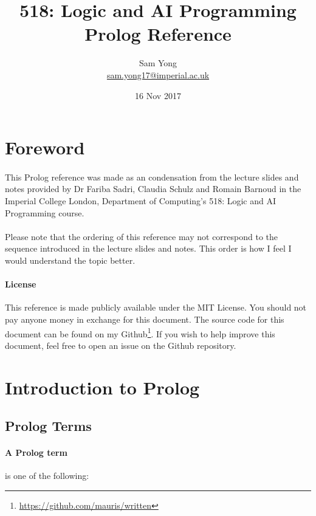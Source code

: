 \documentclass{article}
\title{
	 \large 518: Logic and AI Programming \\
	 \huge Prolog Reference
}
\date{16 Nov 2017}
\author{
	Sam Yong \\
	\small \href{mailto:sam.yong17@imperial.ac.uk}{sam.yong17@imperial.ac.uk}
}
\begin{document}
  \maketitle
  
  \begin{multicols}{2}
  
  \section*{Foreword}  
  
  \paragraph{} This Prolog reference was made as an condensation from the lecture slides and notes provided by Dr Fariba Sadri, Claudia Schulz and Romain Barnoud in the Imperial College London, Department of Computing's 518: Logic and AI Programming course.
  
  \paragraph{} Please note that the ordering of this reference may not correspond to the sequence introduced in the lecture slides and notes. This order is how I feel I would understand the topic better.
  
  \paragraph{License} This reference is made publicly available under the MIT License. You should not pay anyone money in exchange for this document. The source code for this document can be found on my Github\footnote{\href{https://github.com/mauris/written}{https://github.com/mauris/written}}. If you wish to help improve this document, feel free to open an issue on the Github repository.
  
  \section{Introduction to Prolog}    
  
  \subsection{Prolog Terms}
  
  \paragraph{A Prolog term} is one of the following:
  

\end{multicols}
\end{document}
